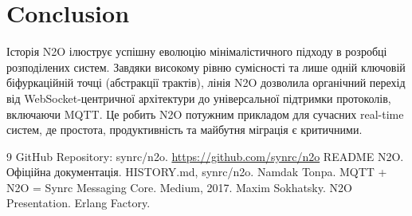 \documentclass{article}
\begin{document}
\section{Conclusion}
Історія N2O ілюструє успішну еволюцію мінімалістичного підходу в розробці розподілених систем.
Завдяки високому рівню сумісності та лише одній ключовій біфуркаційній точці (абстракції трактів),
лінія N2O дозволила органічний перехід від WebSocket-центричної архітектури до універсальної підтримки протоколів,
включаючи MQTT. Це робить N2O потужним прикладом для сучасних real-time систем, де простота,
продуктивність та майбутня міграція є критичними.

\begin{thebibliography}{9}
 GitHub Repository: synrc/n2o. \url{https://github.com/synrc/n2o}
 README N2O. Офіційна документація.
 HISTORY.md, synrc/n2o.
 Namdak Tonpa. MQTT + N2O = Synrc Messaging Core. Medium, 2017.
 Maxim Sokhatsky. N2O Presentation. Erlang Factory.
\end{thebibliography}
\end{document}
